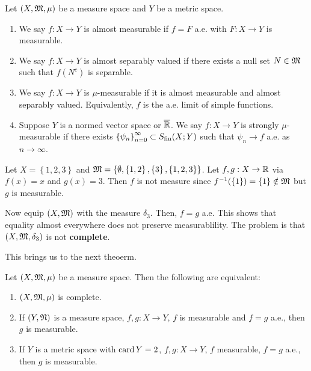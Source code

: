 \documentclass[a4paper]{article}
\begin{document}
\begin{defi}
  Let $(X, \mathfrak{M}, \mu)$ be a measure space and $Y$ be a metric 
  space. 
  \begin{enumerate}
    \item We say $f : X \to Y$ is almost measurable 
    if $f = F$ a.e. with $F: X \to Y$ is measurable.
    
    \item We say $f : X \to Y$ is almost separably valued
    if there exists a null set $N \in \mathfrak{M}$ such that 
    $f(N^c)$ is separable.
    
    \item We say $f: X \to Y$ is $\mu$-measurable if 
    it is almost measurable and almost separably valued.
    Equivalently, $f$ is the a.e. limit of simple functions.

    \item Suppose $Y$ is a normed vector space or $\overline{\mathbb{R}}$.
    We say $f: X \to Y$ is strongly $\mu$-measurable 
    if there exists $\left\{ \psi_n \right\}_{n=0}^\infty \subset S_{\text{fin}}(X; Y)$
    such that $\psi_n \to f$ a.e. as $n \to \infty$.
  \end{enumerate}
\end{defi}

\begin{eg}
  Let $X = \left\{ 1,2,3 \right\}$ and $\mathfrak{M} = 
  \left\{ \emptyset, \left\{ 1, 2 \right\}, 
  \left\{ 3 \right\}, \left\{ 1, 2, 3 \right\} \right\}$.
  Let $f, g: X \to \mathbb{R}$ via $f(x) = x$ and $g(x) = 3$.
  Then $f$ is not measure since $f^{-1} (\left\{ 1 \right\})
  = \left\{ 1 \right\} \notin \mathfrak{M}$ but $g$ is measurable.

  Now equip $(X, \mathfrak{M})$ with the measure $\delta_3$.
  Then, $f = g$ a.e. This shows that equality almost 
  everywhere does not preserve measurablility.
  The problem is that $(X, \mathfrak{M}, \delta_3)$ is not 
  \textbf{complete}.
\end{eg}

This brings us to the next theoerm.

\begin{thm}
Let $(X, \mathfrak{M}, \mu)$ be a measure space. Then the following 
are equivalent:
\begin{enumerate}
  \item $(X, \mathfrak{M}, \mu)$ is complete. 
  \item If $(Y, \mathfrak{N})$ is a measure space, $f, g : X 
  \to Y$, $f$ is measurable and $f = g$ a.e., then 
  $g$ is measurable.
  \item If $Y$ is a metric space with $\operatorname{card} Y = 2$, 
  $f, g: X \to Y$, $f$ measurable, $f = g$ a.e., 
  then $g$ is measurable.
\end{enumerate}  
\end{thm}
\end{document}
